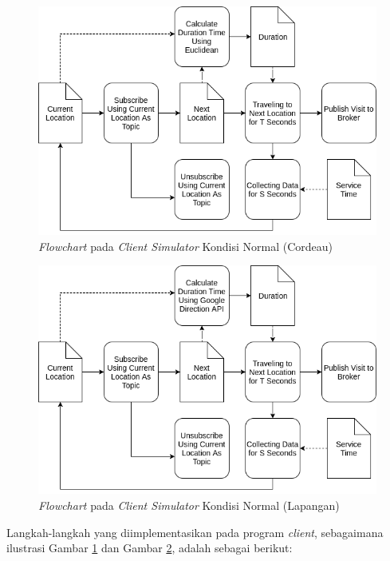 \begin{figure}[h]
    \centering
    \includegraphics[width=\textwidth]{../../Resources/Images/client-algorithm-nornal-cordeau}
    \caption{\textit{Flowchart} pada \textit{Client Simulator} Kondisi Normal (Cordeau)}
    \label{fig:client-algorithm-nornal-cordeau}
\end{figure}


\begin{figure}[h]
    \centering
    \includegraphics[width=\textwidth]{../../Resources/Images/client-algorithm-nornal-field}
    \caption{\textit{Flowchart} pada \textit{Client Simulator} Kondisi Normal (Lapangan)}
    \label{fig:client-algorithm-nornal-field}
\end{figure}


Langkah-langkah yang diimplementasikan pada program \textit{client}, sebagaimana ilustrasi Gambar \ref{fig:client-algorithm-nornal-cordeau} dan Gambar \ref{fig:client-algorithm-nornal-field}, adalah sebagai berikut:

